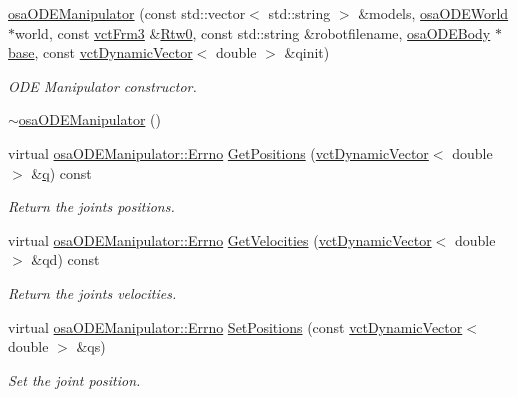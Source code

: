 \begin{DoxyCompactItemize}
\hyperlink{classosa_o_d_e_manipulator_a7eeebc7b152dde1b5964ef57e74d8241}{osa\+O\+D\+E\+Manipulator} (const std\+::vector$<$ std\+::string $>$ \&models, \hyperlink{classosa_o_d_e_world}{osa\+O\+D\+E\+World} $\ast$world, const \hyperlink{vct_transformation_types_8h_a81feda0a02c2d1bc26e5553f409fed20}{vct\+Frm3} \&\hyperlink{classrob_manipulator_ab48d9d9a166bf252698bc35788ca6ad6}{Rtw0}, const std\+::string \&robotfilename, \hyperlink{classosa_o_d_e_body}{osa\+O\+D\+E\+Body} $\ast$\hyperlink{classosa_o_s_g_manipulator_a6c69fd718f80ec8c73a408f01d2819ef}{base}, const \hyperlink{classvct_dynamic_vector}{vct\+Dynamic\+Vector}$<$ double $>$ \&qinit)
\begin{DoxyCompactList}\small\item\em O\+D\+E Manipulator constructor. \end{DoxyCompactList}\item 
\hyperlink{classosa_o_d_e_manipulator_a873fbd930715ca4f3bfcfb88369d0fd2}{$\sim$osa\+O\+D\+E\+Manipulator} ()
\item 
virtual \hyperlink{classrob_manipulator_a7bbb51cdb81c9c681075a9274ca0cdc0}{osa\+O\+D\+E\+Manipulator\+::\+Errno} \hyperlink{classosa_o_d_e_manipulator_a814f93a02207d689961149a0677161f5}{Get\+Positions} (\hyperlink{classvct_dynamic_vector}{vct\+Dynamic\+Vector}$<$ double $>$ \&\hyperlink{classosa_o_s_g_manipulator_a834ce7263dace4d925133753522abaa3}{q}) const 
\begin{DoxyCompactList}\small\item\em Return the joints positions. \end{DoxyCompactList}\item 
virtual \hyperlink{classrob_manipulator_a7bbb51cdb81c9c681075a9274ca0cdc0}{osa\+O\+D\+E\+Manipulator\+::\+Errno} \hyperlink{classosa_o_d_e_manipulator_a2682ef7b3c753bbfc5c04cde81a42f60}{Get\+Velocities} (\hyperlink{classvct_dynamic_vector}{vct\+Dynamic\+Vector}$<$ double $>$ \&qd) const 
\begin{DoxyCompactList}\small\item\em Return the joints velocities. \end{DoxyCompactList}\item 
virtual \hyperlink{classrob_manipulator_a7bbb51cdb81c9c681075a9274ca0cdc0}{osa\+O\+D\+E\+Manipulator\+::\+Errno} \hyperlink{classosa_o_d_e_manipulator_abf657b561796274ba82dc505517f225f}{Set\+Positions} (const \hyperlink{classvct_dynamic_vector}{vct\+Dynamic\+Vector}$<$ double $>$ \&qs)
\begin{DoxyCompactList}\small\item\em Set the joint position. \end{DoxyCompactList}\item 

\end{DoxyCompactItemize}
